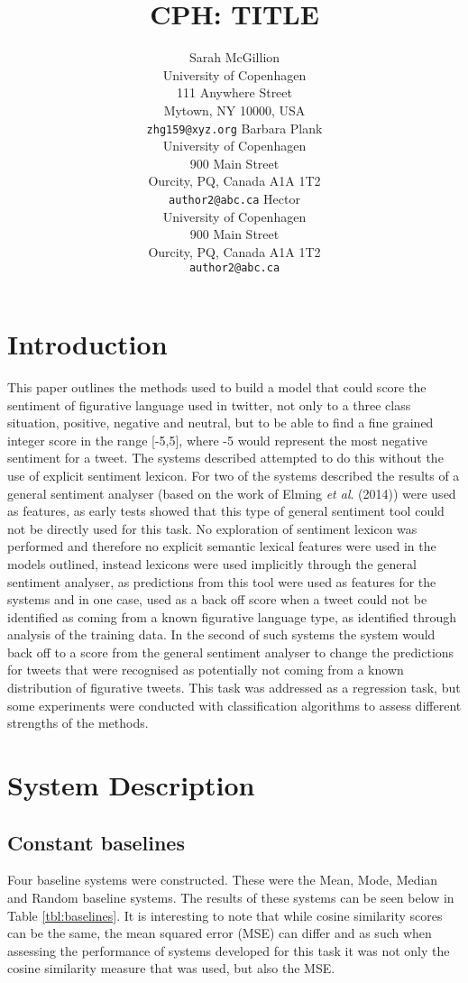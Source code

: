 \documentclass[11pt,letterpaper]{article}
\title{CPH: TITLE}
\author{Sarah McGillion\\
	    University of Copenhagen\\
	    111 Anywhere Street\\
	    Mytown, NY 10000, USA\\
	    {\tt zhg159@xyz.org}
	  \And
	Barbara Plank\\
  	University of Copenhagen\\
  	900 Main Street\\
  	Ourcity, PQ, Canada A1A 1T2\\
  {\tt author2@abc.ca}
	 \And
	Hector\\
  	University of Copenhagen\\
  	900 Main Street\\
  	Ourcity, PQ, Canada A1A 1T2\\
  {\tt author2@abc.ca}}
\date{}
\begin{document}
\maketitle
\begin{abstract}
 
\end{abstract}

\section{Introduction}
This paper outlines the methods used to build a model that could score the sentiment of figurative language used in twitter, not only to a three class situation, positive, negative and neutral, but to be able to find a fine grained integer score in the range [-5,5], where -5 would represent the most negative sentiment for a tweet. The systems described attempted to do this without the use of explicit sentiment lexicon. For two of the systems described the results of a general sentiment analyser (based on the work of Elming {\it et al}. (2014)) were used as features, as early tests showed that this type of general sentiment tool could not be directly used for this task. No exploration of sentiment lexicon was performed and therefore no explicit semantic lexical features were used in the models outlined, instead lexicons were used implicitly through the general sentiment analyser, as predictions from this tool were used as features for the systems and in one case, used as a back off score when a tweet could not be identified as coming from a known figurative language type, as identified through analysis of the training data. In the second of such systems the system would back off to a score from the general sentiment analyser to change the predictions for tweets that were recognised as potentially not coming from a known distribution of figurative tweets. This task was addressed as a regression task, but some experiments were conducted with classification algorithms to assess different strengths of the methods. 


\section{System Description}

\subsection{Constant baselines}
Four baseline systems were constructed. These were the Mean, Mode, Median and Random baseline systems. The results of these systems can be seen below in Table \ref{tbl:baselines}. It is interesting to note that while cosine similarity scores can be the same, the mean squared error (MSE) can differ and as such when assessing the performance of systems developed for this task it was not only the cosine similarity measure that was used, but also the MSE.
\end{document}
